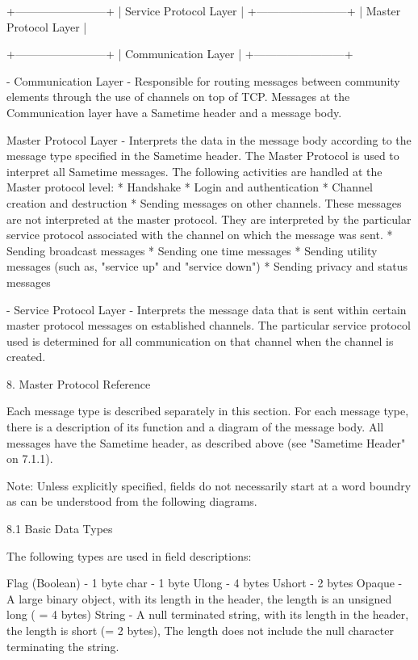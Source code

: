 \documentclass[titlepage,oneside]{book}
\begin{document}
+------------------------+
| Service Protocol Layer |
+------------------------+
|  Master Protocol Layer |

+------------------------+
|    Communication Layer |
+------------------------+

- Communication Layer - Responsible for routing messages between
community elements through the use of channels on top of TCP. Messages
at the Communication layer have a Sametime header and a message body.

Master Protocol Layer - Interprets the data in the message body
according to the message type specified in the Sametime header. The
Master Protocol is used to interpret all Sametime messages. The
following   activities are handled at the Master protocol level:
    * Handshake
    * Login and authentication
    * Channel creation and destruction
    * Sending messages on other channels. These messages are not
      interpreted at the master protocol. They are interpreted by
      the particular service protocol associated with the channel
      on which the message was sent.
    * Sending broadcast messages
    * Sending one time messages
    * Sending utility messages (such as, "service up" and "service
      down")
    * Sending privacy and status messages

- Service Protocol Layer - Interprets the message data that is sent
within certain master protocol messages on established channels. The
particular service protocol used is determined for all communication on
that channel when the channel is created.

8. Master Protocol Reference


Each message type is described separately in this section. For each
message type, there is a description of its function and a diagram of
the message body. All messages have the Sametime header, as described
above (see "Sametime Header" on 7.1.1).

Note: Unless explicitly specified, fields do not necessarily start at
a word boundry as can be understood from the following diagrams.

8.1 Basic Data Types

The following types are used in field descriptions:

Flag (Boolean) - 1 byte
char           - 1 byte
Ulong          - 4 bytes
Ushort         - 2 bytes
Opaque         - A large binary object, with its length in the header,
                 the length is an unsigned long ( = 4 bytes)
String         - A null terminated string, with its length in the
                 header, the length is short (= 2 bytes), The length
                 does not include the null character terminating the
                 string.
\end{document}
